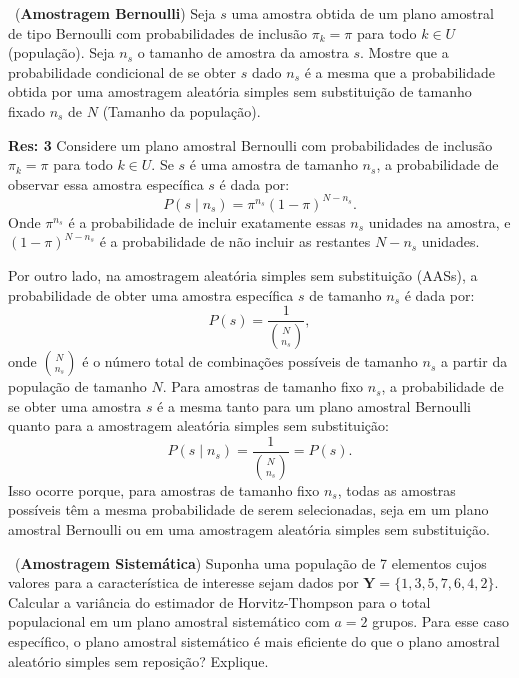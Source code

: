 \documentclass[a4paper,11pt,oneside,twocolumn]{Config/milktest}
\begin{document}
\medskip 
\question~({\bf Amostragem Bernoulli}) Seja $s$ uma amostra obtida de um plano amostral de tipo Bernoulli com probabilidades de inclusão $\pi_k = \pi$ para todo $k \in U$ (população). Seja $n_s$ o tamanho de amostra da amostra $s.$ Mostre que a probabilidade condicional de se obter $s$ dado $n_s$ é a mesma que a probabilidade obtida por uma amostragem aleatória simples sem substituição de tamanho fixado $n_s$ de $N$ (Tamanho da população). 

\medskip
{\scriptsize  {\bf Res: 3}
Considere um plano amostral Bernoulli com probabilidades de inclusão \( \pi_k = \pi \) para todo \( k \in U \). Se \( s \) é uma amostra de tamanho \( n_s \), a probabilidade de observar essa amostra específica \( s \) é dada por: 
\[
P(s \mid n_s) = \pi^{n_s} (1 - \pi)^{N - n_s}.
\] Onde \( \pi^{n_s} \) é a probabilidade de incluir exatamente essas \( n_s \) unidades na amostra, e \( (1 - \pi)^{N - n_s} \) é a probabilidade de não incluir as restantes \( N - n_s \) unidades.

Por outro lado, na amostragem aleatória simples sem substituição (AASs), a probabilidade de obter uma amostra específica \( s \) de tamanho \( n_s \) é dada por:
\[
P(s) = \frac{1}{\binom{N}{n_s}},
\] 
onde \( \binom{N}{n_s} \) é o número total de combinações possíveis de tamanho \( n_s \) a partir da população de tamanho \( N \). 
Para amostras de tamanho fixo \( n_s \), a probabilidade de se obter uma amostra \( s \) é a mesma tanto para um plano amostral Bernoulli quanto para a amostragem aleatória simples sem substituição: 
\[
P(s \mid n_s) = \frac{1}{\binom{N}{n_s}} = P(s).
\] Isso ocorre porque, para amostras de tamanho fixo \( n_s \), todas as amostras possíveis têm a mesma probabilidade de serem selecionadas, seja em um plano amostral Bernoulli ou em uma amostragem aleatória simples sem substituição.
}


\medskip
\question~({\bf Amostragem Sistemática}) Suponha uma população de 7 elementos cujos valores para a característica de interesse sejam dados por
$\mathbf{Y} = \{1, 3, 5, 7, 6, 4, 2\}.$ Calcular a variância do estimador de Horvitz-Thompson para o total populacional em um plano amostral sistemático com $a = 2$ grupos. Para esse caso específico, o plano amostral sistemático é mais eficiente do que o plano amostral aleatório simples sem reposição? Explique.
\end{document}
